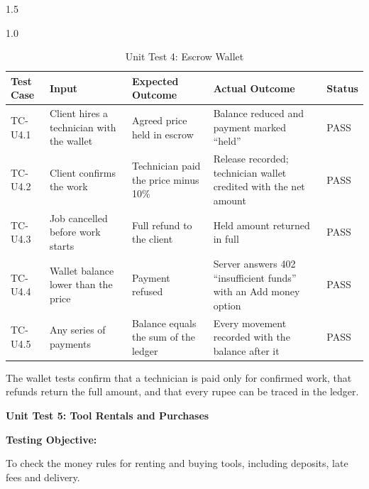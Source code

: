 \documentclass[A4paper,12pt]{report}
\theoremstyle{plain}
\theoremstyle{definition}
\theoremstyle{remark}
\numberwithin{equation}{section}
\begin{document}
\begin{spacing}{1.5}
\begin{table}[H]
\centering
\caption{Unit Test 4: Escrow Wallet}
\begin{spacing}{1.0}
{\small
\begin{tabular}{|p{}|p{}|p{}|p{}|p{}|}
\hline
\textbf{Test Case} & \textbf{Input} & \textbf{Expected Outcome} & \textbf{Actual Outcome} & \textbf{Status} \\ \hline
TC-U4.1 & Client hires a technician with the wallet & Agreed price held in escrow & Balance reduced and payment marked ``held'' & PASS \\ \hline
TC-U4.2 & Client confirms the work & Technician paid the price minus 10\% & Release recorded; technician wallet credited with the net amount & PASS \\ \hline
TC-U4.3 & Job cancelled before work starts & Full refund to the client & Held amount returned in full & PASS \\ \hline
TC-U4.4 & Wallet balance lower than the price & Payment refused & Server answers 402 ``insufficient funds'' with an Add money option & PASS \\ \hline
TC-U4.5 & Any series of payments & Balance equals the sum of the ledger & Every movement recorded with the balance after it & PASS \\ \hline
\end{tabular}}
\end{spacing}
\end{table}

The wallet tests confirm that a technician is paid only for confirmed work, that refunds return the full amount, and that every rupee can be traced in the ledger.

\textbf{Unit Test 5: Tool Rentals and Purchases}

\textbf{Testing Objective:}

To check the money rules for renting and buying tools, including deposits, late fees and delivery.


\end{spacing}
\end{document}
